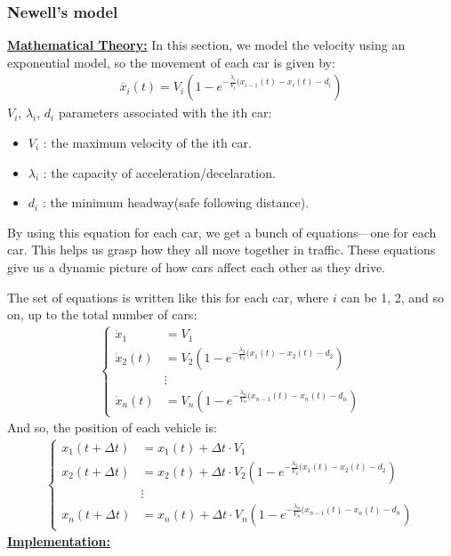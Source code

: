 \documentclass{article}
\begin{document}
		\subsubsection{Newell's model} 
		\textbf{\underline{Mathematical Theory:}}
		In this section, we model the velocity using an exponential model, so the movement of each car is given by:
		\begin{align*}
			\boxed{\dot{x_i}(t) =V_i(1-e^{-\frac{\lambda_i}{V_i}(x_{i-1}(t) - x_i(t) - d_i})}
		\end{align*} 
		$V_i$, $\lambda_i$, $d_i$ parameters associated with the ith car:
		\begin{itemize}
			\item $V_i$ : the maximum velocity of the ith car.
			\item $\lambda_i$ : the capacity of acceleration/decelaration.
			\item $d_i$ : the minimum headway(safe following distance). 
		\end{itemize}
		By using this equation for each car, we get a bunch of equations—one for each car. This helps us grasp how they all move together in traffic. These equations give us a dynamic picture of how cars affect each other as they drive.\newline
		
		The set of equations is written like this for each car, where $i$ can be 1, 2, and so on, up to the total number of cars:
		\begin{align*}
			\left\{
			\begin{array}{ll}
				\dot{x}_1 &= V_1 \\
				\dot{x}_2(t) &= V_2(1-e^{-\frac{\lambda_2}{V_2}(x_{1}(t) - x_2(t) - d_2}) \\
				&\vdots \\
				\dot{x}_n(t) &= V_n(1-e^{-\frac{\lambda_n}{V_n}(x_{n-1}(t) - x_n(t) - d_n})
			\end{array}
			\right.
		\end{align*}
		\newline
		And so, the position of each vehicle is:
		\begin{align*}
			\left\{
			\begin{array}{ll}
				x_1(t + \Delta t) &= x_1(t) + \Delta t \cdot  V_1\\
				x_2(t + \Delta t) &= x_2(t) + \Delta t \cdot V_2(1-e^{-\frac{\lambda_2}{V_2}(x_{1}(t) - x_2(t) - d_2}) \\
				&\vdots \\
				x_n(t + \Delta t) &= x_n(t) + \Delta t \cdot V_n(1-e^{-\frac{\lambda_n}{V_n}(x_{n-1}(t) - x_n(t) - d_n})
			\end{array}
			\right.
		\end{align*}
		\newpage
		\textbf{\underline{Implementation:}} \newline\newline
		
\end{document}
